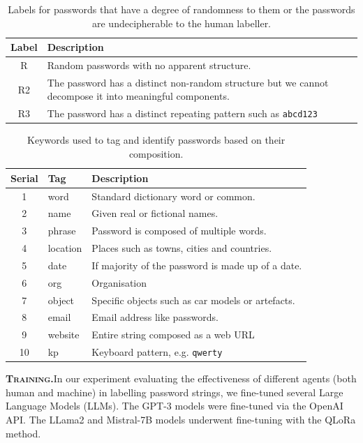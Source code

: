 \begin{table}[]
    \centering
    \setlength\tabcolsep{6pt} %
    \caption{Labels for passwords that have a degree of randomness to them or the passwords are undecipherable to the human labeller.}
    \label{table:randomtags}
    \begin{tabular}{cp{9cm}}
    \toprule
    \textbf{Label} & \textbf{Description} \\
    \midrule
     R    &  Random passwords with no apparent structure.\\
     R2   &  The password has a distinct non-random structure but we cannot decompose it into meaningful components.\\
     R3   &  The password has a distinct repeating pattern such as \texttt{abcd123}\\
     \bottomrule
    \end{tabular}
\end{table}


\begin{table}[]
    \centering
    \setlength\tabcolsep{6pt} %
    \caption{Keywords used to tag and identify passwords based on their composition.}
    \label{table:tags}
    \begin{tabular}{clp{9cm}}
    \toprule
    \textbf{Serial} & \textbf{Tag} & \textbf{Description} \\
    \midrule
    1 & word & Standard dictionary word or common. \\
    2 & name & Given real or fictional names. \\
    3 & phrase & Password is composed of multiple words. \\
    4 & location & Places such as towns, cities and countries. \\
    5 & date & If majority of the password is made up of a date. \\
    6 & org & Organisation \\
    7 & object & Specific objects such as car models or artefacts. \\
    8 & email & Email address like passwords. \\
    9 & website & Entire string composed as a web URL \\ 
    10 & kp & Keyboard pattern, e.g. \texttt{qwerty} \\
    \bottomrule
    \end{tabular}
\end{table}

\textbf{\textsc{Training.}}\;In our experiment evaluating the effectiveness of different agents (both human and machine) in labelling password strings, we fine-tuned several Large Language Models (LLMs). The GPT-3 models were fine-tuned via the OpenAI API. The LLama2 and Mistral-7B models underwent fine-tuning with the QLoRa \cite{dettmers_qlora_2023} method.
